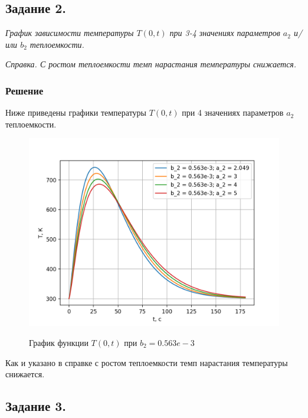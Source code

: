 \documentclass[a4paper,12pt]{article}
\begin{document}
	\newpage
	
	\subsection*{Задание 2.}
	
	\textit{График зависимости температуры $T(0, t)$ при 3-4 значениях параметров $a_2$ и/или $b_2$ теплоемкости.}
	
	\textit{Справка. С ростом теплоемкости темп нарастания температуры снижается.}
	
	\subsubsection*{Решение}
	
	Ниже приведены графики температуры $T(0, t)$ при 4 значениях параметров $a_2$ теплоемкости.
	
	\begin{figure}[h!]
		\begin{center}
			{\includegraphics[scale = 0.8]{a_2_b_2.png}}
		\end{center}
		\caption{График функции $T(0, t)$ при $b_2 = 0.563e-3$}
		\label{ris:a_2_b_2}
	\end{figure}

	Как и указано в справке с ростом теплоемкости темп нарастания температуры снижается.
	
	\newpage
	
	\subsection*{Задание 3.}
	
\end{document}
